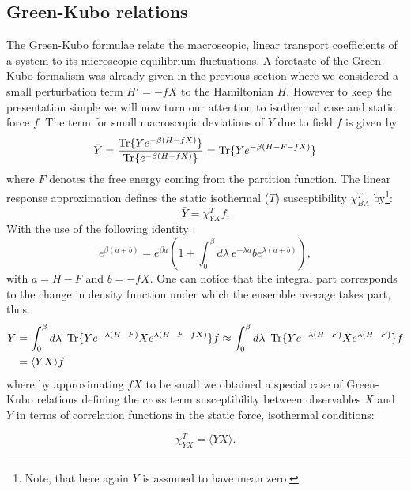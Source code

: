 \documentclass[a4paper,12pt]{article}
\begin{document}
\subsection{Green-Kubo relations}

The Green-Kubo formulae relate the macroscopic, linear transport coefficients of a system to its microscopic equilibrium fluctuations.
A foretaste of the Green-Kubo formalism was already given in the previous section where we considered a small perturbation term $H'=-f X$ to the Hamiltonian $H$. However to keep the presentation simple we will now turn our attention to isothermal case and static force $f$.
The term for small macroscopic deviations of $Y$ due to field $f$ is given by
\begin{equation}
\bar{Y}=\frac{\Tr\{ Y e^{-\beta (H-f X)} \}}{\Tr\{ e^{-\beta (H-f X)} \}} = \Tr\{ Y e^{-\beta (H - F -f X )} \}
\end{equation}
where $F$ denotes the free energy coming from the partition function. The linear response approximation defines the static isothermal ($T$) susceptibility $\chi_{BA}^T$ by\footnote{Note, that here again $Y$ is assumed to have mean zero.}:
\begin{equation}
  \bar{Y} =\chi_{YX}^T f.
\end{equation}
With the use of the following identity \cite{Kubo:1957cl}:
\begin{equation}
  e^{\beta (a+b) }=e^{\beta a} (1+\int_0^{\beta} d\lambda\ e^{-\lambda a} b e^{\lambda (a+b)}),
\end{equation}
with $a=H-F$ and $b=-f X$. One can notice that the integral part corresponds to the change in density function under which the ensemble average takes part, thus
\begin{equation}
\begin{aligned}
  \bar{Y} &= \int_0^{\beta} d\lambda\ \Tr\{ Y e^{-\lambda (H - F)} X e^{\lambda (H-F-f X)} \} f \approx  \int_0^{\beta} d\lambda\ \Tr\{ Y e^{-\lambda (H - F)} X e^{\lambda (H-F)} \} f \\
  &= \langle Y X \rangle f
\end{aligned}
\end{equation}
where by approximating $f X$ to be small we obtained a special case of Green-Kubo relations defining the cross term susceptibility between observables $X$ and $Y$ in terms of correlation functions in the static force, isothermal conditions:

\begin{equation}
  \chi_{YX}^T = \langle Y X \rangle.
\end{equation}
\end{document}

